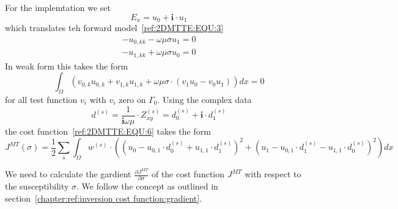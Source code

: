 For the implemtation we set
\begin{equation}\label{ref:2DMTTE:EQU:100}
E_x  = u_0 + \mathbf{i} \cdot u_1
\end{equation}
which translates teh forward model~\ref{ref:2DMTTE:EQU:3}
\begin{align}\label{ref:2DMTTE:EQU:103}
- u_{0,kk}  - \omega \mu \sigma u_1 = 0 \\
- u_{1,kk}  + \omega \mu \sigma u_0 = 0 
\end{align}
In weak form this takes the form 
\begin{equation}\label{ref:2DMTTE:EQU:104}
\int_{\Omega}
\left(
v_{0,k}u_{0,k}
+ v_{1,k}u_{1,k}
+ \omega \mu \sigma \cdot ( v_1 u_0 - v_0 u_1) \right) dx =0  
\end{equation}
for all test function $v_i$ with $v_i$ zero on $\Gamma_0$. 
Using the complex data 
\begin{equation}\label{ref:2DMTTE:EQU:105}
d^{(s)} =  \frac{1}{\mathbf{i} \omega \mu} \cdot Z_{xy}^{(s)} = d^{(s)}_0 +  \mathbf{i} \cdot d_1^{(s)}
\end{equation}
the cost function~\ref{ref:2DMTTE:EQU:6} takes the form
\begin{equation}\label{ref:2DMTTE:EQU:106}
J^{MT}(\sigma)=
\frac{1}{2}\sum_{s} \int_{\Omega} w^{(s)} \cdot \left(  (u_0- u_{0,1} \cdot d_0^{(s)} + u_{1,1} \cdot d_1^{(s)}  )^2 
 + ( u_1- u_{0,1} \cdot d_1^{(s)} -u_{1,1} \cdot d_0^{(s)} )^2 \right) dx 
\end{equation} 

We need to calculate the gardient 
$\frac{\partial J^{MT}}{\partial \sigma}$ of the cost function $J^{{MT}}$ with
respect to the susceptibility $\sigma$.  We follow the concept as outlined in section~\ref{chapter:ref:inversion cost function:gradient}.

